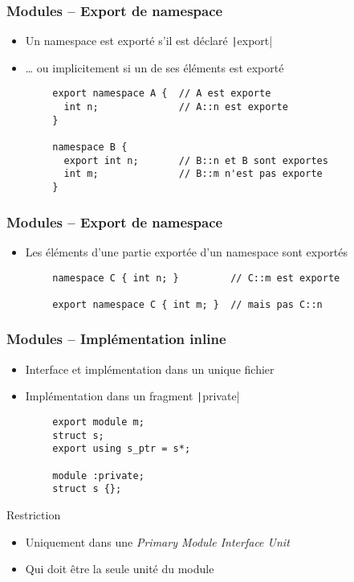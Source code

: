 \documentclass[C++.tex]{subfiles}
\begin{document}
\begin{frame}[fragile]
	\frametitle{Modules -- Export de namespace}
	\begin{itemize}
		\item Un namespace est exporté s'il est déclaré \texttt|export|
		\item \ldots{} ou implicitement si un de ses éléments est exporté
	\end{itemize}

	\begin{verbatim}
		export namespace A {  // A est exporte
		  int n;              // A::n est exporte
		}

		namespace B {
		  export int n;       // B::n et B sont exportes
		  int m;              // B::m n'est pas exporte
		}
	\end{verbatim}
\end{frame}

\begin{frame}[fragile]
	\frametitle{Modules -- Export de namespace}
	\begin{itemize}
		\item Les éléments d'une partie exportée d'un namespace sont exportés
	\end{itemize}
	
	\begin{verbatim}
		namespace C { int n; }         // C::m est exporte
		
		export namespace C { int m; }  // mais pas C::n
	\end{verbatim}
\end{frame}

\begin{frame}[fragile]
	\frametitle{Modules -- Implémentation inline}
	\begin{itemize}
		\item Interface et implémentation dans un unique fichier
		\item Implémentation dans un fragment \texttt|private|
	\end{itemize}

	\begin{verbatim}
		export module m;
		struct s;
		export using s_ptr = s*;

		module :private;
		struct s {};
	\end{verbatim}

	\begin{alertblock}{Restriction}
		\begin{itemize}
			\item Uniquement dans une \textit{Primary Module Interface Unit} 
			\item Qui doit être la seule unité du module
		\end{itemize}
	\end{alertblock}
\end{frame}
\end{document}
